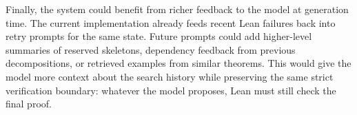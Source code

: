 Finally, the system could benefit from richer feedback to the model at generation time. The current
implementation already feeds recent Lean failures back into retry prompts for the same state. Future
prompts could add higher-level summaries of reserved skeletons, dependency feedback from previous
decompositions, or retrieved examples from similar theorems. This would give the model more context
about the search history while preserving the same strict verification boundary: whatever the model
proposes, Lean must still check the final proof.
